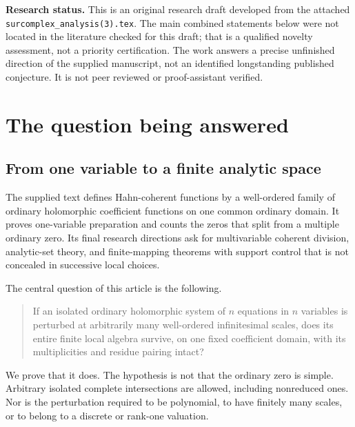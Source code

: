\documentclass[11pt,letterpaper]{article}
\theoremstyle{definition}
\theoremstyle{remark}
\numberwithin{equation}{section}
\begin{document}
\begin{titlepage}
\begin{minipage}{0.92\textwidth}
\begin{abstract}
The proof uses classical Koszul exactness, the homological perturbation lemma, and ordinary residue duality. The contribution offered here is the explicit fixed-domain Hahn implementation and its geometric and quantitative consequences, not a claim to have invented those classical mechanisms. Full proofs of the extension steps are given; the finite examples are also checked symbolically.
\end{abstract}
\end{minipage}
\vfill
\begin{minipage}{0.92\textwidth}\small\raggedright
\textbf{Research status.} This is an original research draft developed from the attached \texttt{surcomplex\_analysis(3).tex}. The main combined statements below were not located in the literature checked for this draft; that is a qualified novelty assessment, not a priority certification. The work answers a precise unfinished direction of the supplied manuscript, not an identified longstanding published conjecture. It is not peer reviewed or proof-assistant verified.
\end{minipage}
\end{titlepage}
\tableofcontents
\newpage

\section{The question being answered}\label{sec:intro}

\subsection{From one variable to a finite analytic space}
The supplied text \cite{Companion} defines Hahn-coherent functions by a well-ordered family of ordinary holomorphic coefficient functions on one common ordinary domain. It proves one-variable preparation and counts the zeros that split from a multiple ordinary zero. Its final research directions ask for multivariable coherent division, analytic-set theory, and finite-mapping theorems with support control that is not concealed in successive local choices.

The central question of this article is the following.
\begin{quote}
If an isolated ordinary holomorphic system of $n$ equations in $n$ variables is perturbed at arbitrarily many well-ordered infinitesimal scales, does its entire finite local algebra survive, on one fixed coefficient domain, with its multiplicities and residue pairing intact?
\end{quote}
We prove that it does. The hypothesis is not that the ordinary zero is simple. Arbitrary isolated complete intersections are allowed, including nonreduced ones. Nor is the perturbation required to be polynomial, to have finitely many scales, or to belong to a discrete or rank-one valuation.
\end{document}
